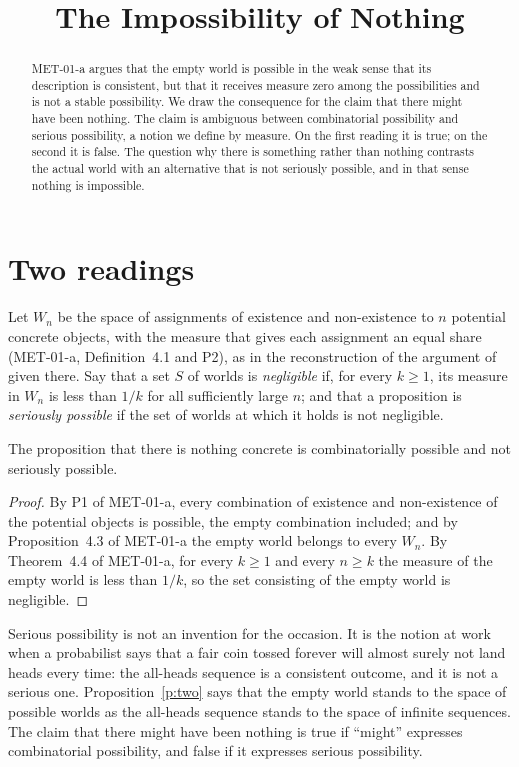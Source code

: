 \documentclass{situationist-preprint}
\title{The Impossibility of Nothing}
\begin{document}
\maketitle

\begin{abstract}
MET-01-a argues that the empty world is possible in the weak sense that its description is consistent, but that it receives measure zero among the possibilities and is not a stable possibility. We draw the consequence for the claim that there might have been nothing. The claim is ambiguous between combinatorial possibility and serious possibility, a notion we define by measure. On the first reading it is true; on the second it is false. The question why there is something rather than nothing contrasts the actual world with an alternative that is not seriously possible, and in that sense nothing is impossible.
\end{abstract}

\section{Two readings}

Let $W_n$ be the space of assignments of existence and non-existence to $n$ potential concrete objects, with the measure that gives each assignment an equal share (MET-01-a, Definition~4.1 and P2), as in the reconstruction of the argument of \citet{vanInwagen1996} given there. Say that a set $S$ of worlds is \emph{negligible} if, for every $k \geq 1$, its measure in $W_n$ is less than $1/k$ for all sufficiently large $n$; and that a proposition is \emph{seriously possible} if the set of worlds at which it holds is not negligible.

\begin{proposition}\label{p:two}
The proposition that there is nothing concrete is combinatorially possible and not seriously possible.
\end{proposition}

\begin{proof}
By P1 of MET-01-a, every combination of existence and non-existence of the potential objects is possible, the empty combination included; and by Proposition~4.3 of MET-01-a the empty world belongs to every $W_n$. By Theorem~4.4 of MET-01-a, for every $k \geq 1$ and every $n \geq k$ the measure of the empty world is less than $1/k$, so the set consisting of the empty world is negligible.
\end{proof}

Serious possibility is not an invention for the occasion. It is the notion at work when a probabilist says that a fair coin tossed forever will almost surely not land heads every time: the all-heads sequence is a consistent outcome, and it is not a serious one. Proposition~\ref{p:two} says that the empty world stands to the space of possible worlds as the all-heads sequence stands to the space of infinite sequences. The claim that there might have been nothing is true if \enquote{might} expresses combinatorial possibility, and false if it expresses serious possibility.
\end{document}
